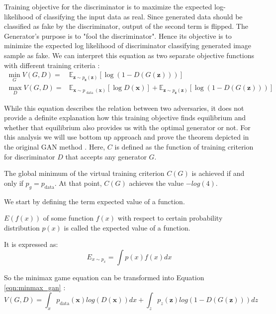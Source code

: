 {Training objective for the discriminator is to maximize the expected log-likelihood of
classifying the input data as real.
Since generated data should be classified as fake by the discriminator, output of the second
term is flipped. The Generator's purpose is to "fool the discriminator". Hence its objective
is to minimize the expected log likelihood of discriminator classifying generated image sample as
fake. We can interpret this equation as two separate objective functions with different training
criteria :
\begin{align}
    \min _{G} V(G, D)=& \mathbb{E}_{\boldsymbol{z} \sim p_{\boldsymbol{z}}(\boldsymbol{z})}[\log (1-D(G(\boldsymbol{z})))] \\[5pt]
    \max _{D} V(G, D)=& \mathbb{E}_{\boldsymbol{x} \sim p_{\text { data }}(\boldsymbol{x})}[\log D(\boldsymbol{x})]+\mathbb{E}_{\boldsymbol{z} \sim p_{\boldsymbol{z}}(\boldsymbol{z})}[\log (1-D(G(\boldsymbol{z})))]
\end{align}

While this equation describes the relation between two adversaries, it does not provide a
definite explanation how this training objective finds equilibrium and whether that equilibrium also
provides us with the optimal generator or not. For this analysis we will use bottom up approach and
prove the theorem depicted in the original GAN method \cite{Goodfellow:2014:GAN:2969033.2969125}. Here,
$C$ is defined as the function of training criterion for discriminator $D$ that accepts any generator $G$.

\begin{theorem}
\label{thr:gan}
The global minimum of the virtual training criterion $C(G)$ is achieved if and only if $p_g = p_{\text{data}}$.
At that point, $C(G)$ achieves the value $-log(4)$.
\end{theorem} 
We start by defining the term expected value of a function. 

\begin{definition}
    $E(f(x))$ of some function $f(x)$ with respect to  certain probability distribution
$p(x)$ is called the expected value of a function.  
\end{definition}

It is expressed as:
\begin{equation}
    \label{eqn:ev}
    E_{x \sim p_x} = \int p(x) f(x) dx
\end{equation}

So the minimax game equation can be transformed into Equation \ref{eqn:minmax_gan} : 
\begin{equation}
    \label{eqn:minmax_gan}
    V( G, D) = \int_x p_{\text{data}}(\boldsymbol{x}) log(D(\boldsymbol{x})) dx + \int_z p_z(\boldsymbol{z}) log(1 - D(G(\boldsymbol{z}))) dz
\end{equation}

}
